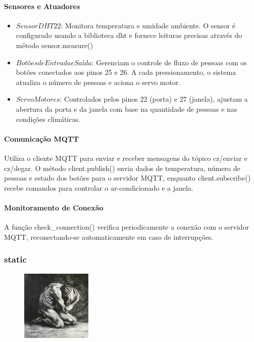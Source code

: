 \documentclass[conference, a4paper, 12pt]{IEEEtran}
\begin{document}
\paragraph{Sensores e Atuadores}
\begin{itemize}
\item $Sensor DHT22$: Monitora temperatura e umidade ambiente. O sensor é configurado usando a biblioteca dht e fornece leituras precisas através do método sensor.measure()
\item $Botões de Entrada e Saída$: Gerenciam o controle de fluxo de pessoas com os botões conectados aos pinos 25 e 26. A cada pressionamento, o sistema atualiza o número de pessoas e aciona o servo motor.
\item $Servo Motores$: Controlados pelos pinos 22 (porta) e 27 (janela), ajustam a abertura da porta e da janela com base na quantidade de pessoas e nas condições climáticas.
\end{itemize}
\paragraph{Comunicação MQTT}
Utiliza o cliente MQTT para enviar e receber mensagens do tópico cz/enviar e cz/degar. O método client.publish() envia dados de temperatura, número de pessoas e estado dos botões para o servidor MQTT, enquanto client.subscribe() recebe comandos para controlar o ar-condicionado e a janela.

\paragraph{Monitoramento de Conexão}
A função check\_connection() verifica periodicamente a conexão com o servidor MQTT, reconectando-se automaticamente em caso de interrupções.
\subsubsection{static}
\begin{figure}[h]



  \begin{center}
    \includegraphics[width=0.30\textwidth]{despair.jpg}
  \end{center}
\end{figure}
\end{document}
